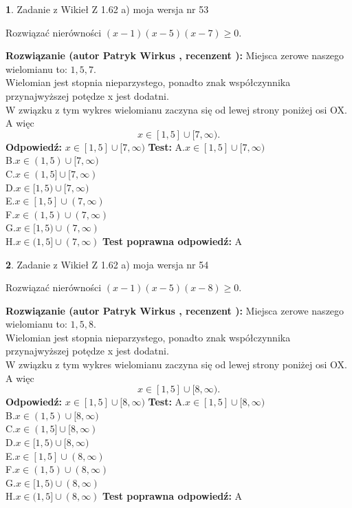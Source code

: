 \documentclass[12pt, a4paper]{article}
\theoremstyle{definition} %
\newtheorem{zad}{}
\newcommand{\zadStart}[1]{\begin{zad}#1\newline}
\newcommand{\zadStop}{\end{zad}}
\newcommand{\rozwStart}[2]{\noindent \textbf{Rozwiązanie (autor #1 , recenzent #2): }\newline}
\newcommand{\rozwStop}{\newline}
\newcommand{\odpStart}{\noindent \textbf{Odpowiedź:}\newline}
\newcommand{\odpStop}{\newline}
\newcommand{\testStart}{\noindent \textbf{Test:}\newline}
\newcommand{\testStop}{\newline}
\newcommand{\kluczStart}{\noindent \textbf{Test poprawna odpowiedź:}\newline}
\newcommand{\kluczStop}{\newline}
\begin{document}
\zadStart{Zadanie z Wikieł Z 1.62 a) moja wersja nr 53}

Rozwiązać nierówności $(x-1)(x-5)(x-7)\ge0$.
\zadStop
\rozwStart{Patryk Wirkus}{}
Miejsca zerowe naszego wielomianu to: $1, 5, 7$.\\
Wielomian jest stopnia nieparzystego, ponadto znak współczynnika przy\linebreak najwyższej potędze x jest dodatni.\\ W związku z tym wykres wielomianu zaczyna się od lewej strony poniżej osi OX. A więc $$x \in [1,5] \cup [7,\infty).$$
\rozwStop
\odpStart
$x \in [1,5] \cup [7,\infty)$
\odpStop
\testStart
A.$x \in [1,5] \cup [7,\infty)$\\
B.$x \in (1,5) \cup [7,\infty)$\\
C.$x \in (1,5] \cup [7,\infty)$\\
D.$x \in [1,5) \cup [7,\infty)$\\
E.$x \in [1,5] \cup (7,\infty)$\\
F.$x \in (1,5) \cup (7,\infty)$\\
G.$x \in [1,5) \cup (7,\infty)$\\
H.$x \in (1,5] \cup (7,\infty)$
\testStop
\kluczStart
A
\kluczStop



\zadStart{Zadanie z Wikieł Z 1.62 a) moja wersja nr 54}

Rozwiązać nierówności $(x-1)(x-5)(x-8)\ge0$.
\zadStop
\rozwStart{Patryk Wirkus}{}
Miejsca zerowe naszego wielomianu to: $1, 5, 8$.\\
Wielomian jest stopnia nieparzystego, ponadto znak współczynnika przy\linebreak najwyższej potędze x jest dodatni.\\ W związku z tym wykres wielomianu zaczyna się od lewej strony poniżej osi OX. A więc $$x \in [1,5] \cup [8,\infty).$$
\rozwStop
\odpStart
$x \in [1,5] \cup [8,\infty)$
\odpStop
\testStart
A.$x \in [1,5] \cup [8,\infty)$\\
B.$x \in (1,5) \cup [8,\infty)$\\
C.$x \in (1,5] \cup [8,\infty)$\\
D.$x \in [1,5) \cup [8,\infty)$\\
E.$x \in [1,5] \cup (8,\infty)$\\
F.$x \in (1,5) \cup (8,\infty)$\\
G.$x \in [1,5) \cup (8,\infty)$\\
H.$x \in (1,5] \cup (8,\infty)$
\testStop
\kluczStart
A
\kluczStop
\end{document}

